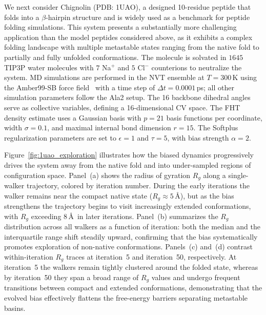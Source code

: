 \documentclass[a4paper,fleqn]{cas-sc}
\theoremstyle{definition}
\begin{document}
We next consider Chignolin (PDB: 1UAO), a designed 10-residue peptide
that folds into a $\beta$-hairpin structure and is widely used as a benchmark
for peptide folding simulations.
This system presents a substantially more challenging application than the model peptides considered above, as it exhibits a complex folding landscape with multiple metastable states ranging from the native fold to partially and fully unfolded conformations.
The molecule is solvated in $1645$ TIP3P water molecules with $7$ Na$^+$ and $5$ Cl$^-$ counterions to neutralize the system.
MD simulations are performed in the NVT ensemble at $T = 300$\,K using the Amber99-SB force field~\cite{hornak2006comparison} with a time step of $\Delta t = 0.0001$\,ps; all other simulation parameters follow the Ala2 setup.
The 16 backbone dihedral angles serve as collective variables, defining a 16-dimensional CV space.
The FHT density estimate uses a Gaussian basis with $p = 21$ basis functions per coordinate, width $\sigma = 0.1$, and maximal internal bond dimension $r = 15$.
The Softplus regularization parameters are set to $\epsilon = 1$ and $\tau = 5$, with bias strength $\alpha = 2$.

Figure~\ref{fig:1uao_exploration} illustrates how the biased dynamics progressively drives the system away from the native fold and into under-sampled regions of configuration space.
Panel~(a) shows the radius of gyration $R_g$ along a single-walker trajectory, colored by iteration number.
During the early iterations the walker remains near the compact native state ($R_g \approx 5$\,\AA), but as the bias strengthens the trajectory begins to visit increasingly extended conformations, with $R_g$ exceeding $8$\,\AA\ in later iterations.
Panel~(b) summarizes the $R_g$ distribution across all walkers as a function of iteration: both the median and the interquartile range shift steadily upward, confirming that the bias systematically promotes exploration of non-native conformations.
Panels~(c) and~(d) contrast within-iteration $R_g$ traces at iteration~5 and iteration~50, respectively.
At iteration~5 the walkers remain tightly clustered around the folded state, whereas by iteration~50 they span a broad range of $R_g$ values and undergo frequent transitions between compact and extended conformations, demonstrating that the evolved bias effectively flattens the free-energy barriers separating metastable basins.
\end{document}
